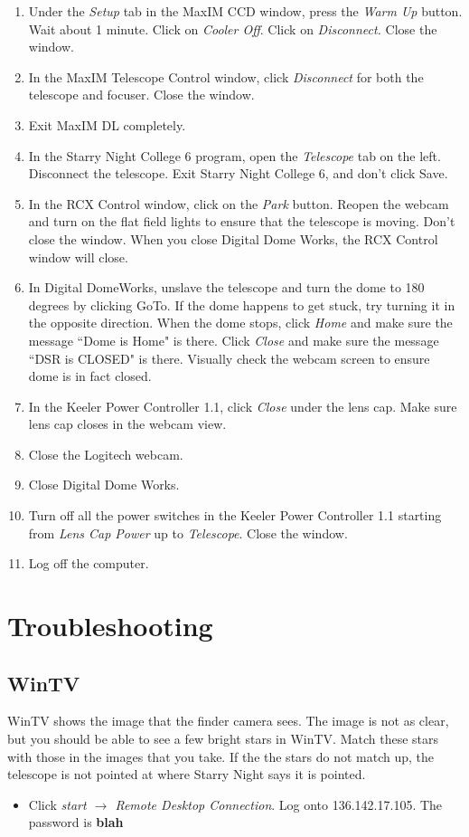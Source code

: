 \documentclass[11pt]{report}
\begin{document}
\begin{enumerate}
\item Under the \emph{Setup} tab in the MaxIM CCD window, press the \emph{Warm Up} button. Wait about 1 minute. Click on \emph{Cooler Off}. Click on \emph{Disconnect.} Close the window.
\item In the MaxIM Telescope Control window, click \emph{Disconnect} for both the telescope and focuser. Close the window.
\item Exit MaxIM DL completely.
\item In the Starry Night College 6 program, open the \emph{Telescope} tab on the left. Disconnect the telescope. Exit Starry Night College 6, and don't click Save.
\item In the RCX Control window, click on the \emph{Park} button. Reopen the webcam and turn on the flat field lights to ensure that the telescope is moving. Don't close the window. When you close Digital Dome Works, the RCX Control window will close.
\item In Digital DomeWorks, unslave the telescope and turn the dome to 180 degrees by clicking GoTo. If the dome happens to get stuck, try turning it in the opposite direction. When the dome stops, click \emph{Home} and make sure the message ``Dome is Home" is there. Click \emph{Close} and make sure the message ``DSR is CLOSED" is there. Visually check the webcam screen to ensure dome is in fact closed.
\item In the Keeler Power Controller 1.1, click \emph{Close} under the lens cap. Make sure lens cap closes in the webcam view.
\item Close the Logitech webcam.
\item Close Digital Dome Works.
\item Turn off all the power switches in the Keeler Power Controller 1.1 starting from \emph{Lens Cap Power} up to \emph{Telescope}. Close the window.
\item Log off the computer.
\end{enumerate}

\chapter{Troubleshooting}

\section{WinTV}

WinTV shows the image that the finder camera sees. The image is not as clear, but you should be able to see a few bright stars in WinTV. Match these stars with those in the images that you take. If the the stars do not match up, the telescope is not pointed at where Starry Night says it is pointed.
\begin{itemize}
\item Click \emph{start {$\rightarrow$} Remote Desktop Connection}. Log onto 136.142.17.105. The password is {\bf blah}
\end{itemize}
\end{document}
